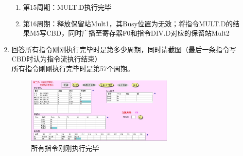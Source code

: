 \documentclass[UTF8]{article}
\begin{document}
\begin{enumerate}
\begin{enumerate}
            \item 第15周期：MULT.D执行完毕
            \item 第16周期：释放保留站Mult1，其Busy位置为无效；将指令MULT.D的结果M5写CBD，同时广播至寄存器F0和指令DIV.D对应的保留站Mult2
        \end{enumerate}
        \item 回答所有指令刚刚执行完毕时是第多少周期，同时请截图（最后一条指令写CBD时认为指令流执行结束） \\
        所有指令刚刚执行完毕时是第57个周期。
        \begin{figure}[H]
            \centering
            \includegraphics[width=0.7\textwidth]{./fig/tomasulo/end.jpg}
            \caption{所有指令刚刚执行完毕}
        \end{figure}
    \end{enumerate}
\end{document}
